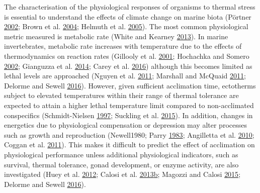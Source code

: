 \documentclass[a4paper,10pt, oneside]{memoir}
\begin{document}
The characterisation of the physiological responses of organisms to thermal stress is essential to understand the effects of climate change on marine biota (Pörtner \protect\hyperlink{ref-Portner2002}{2002}; Brown et al. \protect\hyperlink{ref-Brown2004}{2004}; Helmuth et al. \protect\hyperlink{ref-Helmuth2005}{2005}).
The most common physiological metric measured is metabolic rate (White and Kearney \protect\hyperlink{ref-White2013}{2013}).
In marine invertebrates, metabolic rate increases with temperature due to the effects of thermodynamics on reaction rates (Gillooly et al. \protect\hyperlink{ref-Gillooly2001}{2001}; Hochachka and Somero \protect\hyperlink{ref-Hochachka2002}{2002}; Gianguzza et al. \protect\hyperlink{ref-Gianguzza2014}{2014}; Carey et al. \protect\hyperlink{ref-Carey2016}{2016}) although this becomes limited as lethal levels are approached (Nguyen et al. \protect\hyperlink{ref-Nguyen2011}{2011}; Marshall and McQuaid \protect\hyperlink{ref-Marshall2011}{2011}; Delorme and Sewell \protect\hyperlink{ref-Delorme2016}{2016}).
However, given sufficient acclimation time, ectotherms subject to elevated temperatures within their range of thermal tolerance are expected to attain a higher lethal temperature limit compared to non-acclimated conspecifics (Schmidt-Nielsen \protect\hyperlink{ref-Schmidt-Nielsen1997}{1997}; Suckling et al. \protect\hyperlink{ref-Suckling2015}{2015}).
In addition, changes in energetics due to physiological compensation or depression may alter processes such as growth and reproduction (Newell1980; Parry \protect\hyperlink{ref-Parry1983}{1983}; Angilletta et al. \protect\hyperlink{ref-Angilletta2010}{2010}; Coggan et al. \protect\hyperlink{ref-Coggan2011}{2011}). This makes it difficult to predict the effect of acclimation on physiological performance unless additional physiological indicators, such as survival, thermal tolerance, gonad development, or enzyme activity, are also investigated (Huey et al. \protect\hyperlink{ref-Huey2012}{2012}; Calosi et al. \protect\hyperlink{ref-Calosi2013a}{2013}\protect\hyperlink{ref-Calosi2013a}{b}; Magozzi and Calosi \protect\hyperlink{ref-Magozzi2015}{2015}; Delorme and Sewell \protect\hyperlink{ref-Delorme2016}{2016}).
\end{document}
